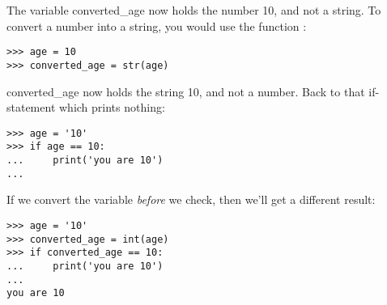 \noindent
The variable converted\_age now holds the number 10, and not a string. To convert a number into a string, you would use the function :

\begin{listing}
\begin{verbatim}
>>> age = 10
>>> converted_age = str(age)
\end{verbatim}
\end{listing}

\noindent
converted\_age now holds the string 10, and not a number. Back to that if-statement which prints nothing:

\begin{listing}
\begin{verbatim}
>>> age = '10'
>>> if age == 10:
...     print('you are 10')
...
\end{verbatim}
\end{listing}

\noindent
If we convert the variable \emph{before} we check, then we'll get a different result:

\begin{listing}
\begin{verbatim}
>>> age = '10'
>>> converted_age = int(age)
>>> if converted_age == 10:
...     print('you are 10')
...
you are 10
\end{verbatim}
\end{listing}

\newpage
